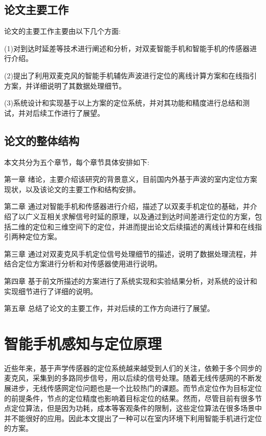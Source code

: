 \documentclass[winfonts]{njuthesis}
\begin{document}
	\section{论文主要工作}

		论文的主要工作主要由以下几个方面:
		
		(1)对到达时延差等技术进行阐述和分析，对双麦智能手机和智能手机的传感器进行介绍。
		
		(2)提出了利用双麦克风的智能手机辅佐声波进行定位的离线计算方案和在线指引方案，并详细说明了其数据处理细节。
		
		(3)系统设计和实现基于以上方案的定位系统，并对其功能和精度进行总结和测试，并对后续工作进行了展望。

	\section{论文的整体结构}
		本文共分为五个章节，每个章节具体安排如下:
		
		第一章 绪论，主要介绍该研究的背景意义，目前国内外基于声波的室内定位方案现状，以及该论文的主要工作和结构安排。
		 
		第二章 通过对智能手机和传感器进行介绍，描述了以双麦手机定位的基础，并介绍了以广义互相关求解信号时延的原理，以及通过到达时间差进行定位的方案，包括二维的定位和三维空间下的定位，并进而提出论文后续描述的离线计算和在线指引两种定位方案。
		
		第三章 通过对双麦克风手机定位信号处理细节的描述，说明了数据处理流程，并结合定位方案进行分析和对传感器使用进行说明。
		
		第四章 基于前文所描述的方案进行了系统实现和实验结果分析，对系统的设计和实现细节进行了详细的说明。
		
		第五章 总结了论文的主要工作，并对后续的工作方向进行了展望。
		
\chapter{智能手机感知与定位原理}\label{chapter_mobile}
	
	近些年来，基于声学传感器的定位系统越来越受到人们的关注，依赖于多个同步的麦克风，采集到的多路同步信号，用以后续的信号处理。随着无线传感网的不断发展进步，无线传感网定位问题也是一个比较热门的课题。而节点定位作为目标定位的前提条件，节点的定位精度也影响着目标定位的结果。然而，尽管目前有很多节点定位算法，但是因为功耗，成本等客观条件的限制，这些定位算法在很多场景中并不能很好的应用。因此本文提出了一种可以在室内环境下利用智能手机进行定位的方案。
	
\end{document}
